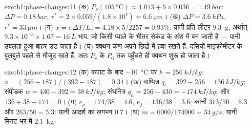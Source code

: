 \begin{solution}{exo:b1:phase-changes:11}
(क) $P_s(\qty{105}{\degreeCelsius}) \approx 1.013 + 5 \times 0.036 = \qty{1.19}{bar}$:
$\Delta P = \qty{0.18}{bar}$, $r^\ast = 2 \times 0.059/(1.8 \times 10^4) = \qty{6.6}{\micro m}$।
(ख) $\Delta P = \qty{3.6}{kPa}$, $r^\ast = \qty{33}{\micro m}$। (ग) $x = c\,\Delta T/L_v =
4.18 \times 5/2257 = 0.93\%$: यानी प्रति लीटर \qty{9.3}{g}, अर्थात् $9.3 \times 10^{-3}
\times 1.67 = \qty{16}{L}$ भाप, जो किसी प्याले के भीतर सेकंड के अंश में बन
जाती है --- पानी उबलता हुआ बाहर उड़ जाता है। (घ) क्वथन-कण अपने छिद्रों में
हवा रखते हैं: दसियों माइक्रोमीटर के बुलबुले पहले से मौजूद रहते हैं, अतः
$P_s$ के $P_0$ तक पहुँचते ही क्वथन शुरू हो जाता है।
\end{solution}

\begin{solution}{exo:b1:phase-changes:12}
(क) कपाट के बाद \qty{-10}{\degreeCelsius} पर $h = \qty{256}{kJ/kg}$: $x =
(256 - 187)/(392 - 187) = 0.34$। (ख) वाष्पित्र $q_c = 392 - 256 =
\qty{136}{kJ/kg}$; संपीडक $w = 430 - 392 = \qty{38}{kJ/kg}$; संघनित्र
$q_h = 256 - 430 = \qty{-174}{kJ/kg}$; और $136 + 38 - 174 = 0$। (ग) $e_p =
174/38 = 4.6$, $e_f = 136/38 = 3.6$; कार्नो $313/50 = 6.3$ और $263/50 =
5.3$: यानी आदर्श का लगभग $0.7$। (घ) $\dot m = 6000/174000 = \qty{34}{g/s}$,
यानी मिनट भर में \qty{2.1}{kg}।
\end{solution}

